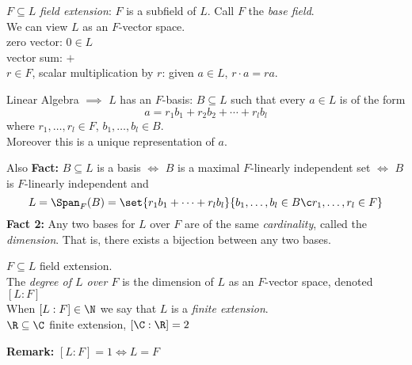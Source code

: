 $F \subseteq L$ \emph{field extension}: $F$ is a subfield of $L$.  Call $F$ the \emph{base field}. \\
We can view $L$ as an $F$-vector space. \\
zero vector: $0\in L$ \\
vector sum: $+$ \\
$r\in F$, scalar multiplication by $r$: given $a\in L$, $r\cdot a=ra$.

Linear Algebra $\implies$ $L$ has an $F$-basis: $B\subseteq L$ such that every $a\in L$ is of the form
\[ a = r_1b_1 + r_2b_2 + \dotsb + r_lb_l \]
where $r_1,\dotsc,r_l\in F$, $b_1,\dotsc,b_l\in B$. \\
Moreover this is a unique representation of $a$.

Also \textbf{Fact:} $B\subseteq L$ is a basis $\iff$ $B$ is a maximal $F$-linearly independent set $\iff$ $B$ is $F$-linearly independent and
\[ L = \Span_F(B) = \set{r_1b_1+\dotsb+r_lb_l}{b_1,\dotsc,b_l\in B\c r_1,\dotsc,r_l\in F} \]
\textbf{Fact 2:} Any two bases for $L$ over $F$ are of the same \emph{cardinality}, called the \emph{dimension}.  That is, there exists a bijection between any two bases.

 $F\subseteq L$ field extension. \\
The \emph{degree of $L$ over $F$} is the dimension of $L$ as an $F$-vector space, denoted $[L:F]$ \\
When $[L:F]\in\N$ we say that $L$ is a \emph{finite extension}. \\
\ex $\R\subseteq\C$ finite extension, $[\C:\R]=2$

\textbf{Remark: }$[L:F]=1\iff L=F$

